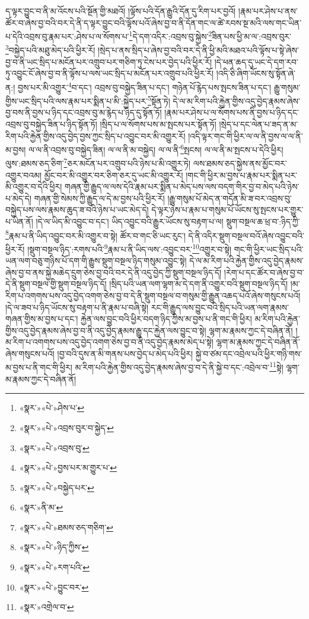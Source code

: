 ད་ལྟར་བྱུང་བ་ནི་མ་འོངས་པའི་སྔོན་གྱི་མཐའོ། །ལྟོས་པའི་དོན་རྒྱུའི་དོན་དུ་རིག་པར་བྱའོ། །རྣམ་པར་ཤེས་པ་ནས་ཚོར་བ་ཞེས་བྱ་བའི་བར་དེ་ནི་ད་ལྟར་བྱུང་བའི་ལྟོས་པའོ་ཞེས་བྱ་བ་ནི་དོན་གང་ལ་ཚེ་རབས་སྔ་མའི་ལས་གང་ཡིན་པ་དེའི་འབྲས་བུ་རྣམ་པར་:ཤེས་པ་ལ་སོགས་པ་\footnote{«སྣར་»«པེ་»ཤེས་པ་}དེ་དག་འདིར་:འབྲས་བུ་སྐྱེས་\footnote{«སྣར་»«པེ་»འབྲས་བུར་བ་སྐྱེད་}ཟིན་པས་ཕྱི་མ་ལ་:འབྲས་བུར་\footnote{«སྣར་»«པེ་»འབྲས་བུ་}བསྐྱེད་པའི་མཐུ་མེད་པའི་ཕྱིར་རོ། །སྲེད་པ་ནས་སྲིད་པ་ཞེས་བྱ་བའི་བར་དེ་ནི་ཕྱི་མའི་མཐའ་པའི་ལྟོས་པ་སྟེ་ཞེས་བྱ་བ་ནི་ཡང་སྲིད་པ་མངོན་པར་འགྲུབ་པར་གཅིག་ཏུ་ངེས་པར་བྱེད་པའི་ཕྱིར་རོ། །དེ་ཕན་ཆད་དུ་ཡང་དེ་དག་རབ་ཏུ་འབྱུང་ངོ་ཞེས་བྱ་བ་ནི་ལྟོས་པ་ལས་ཡང་སྲིད་པ་མངོན་པར་འགྲུབ་པའི་ཕྱིར་རོ། །འདི་ཅི་ཞིག་ཡོངས་སུ་སྟོན་ཞེ་ན:། བྱས་པར་མི་འགྱུར་\footnote{«སྣར་»«པེ་»བྱས་པར་མ་གྱུར་པ་}བ་དང་། འབྲས་བུ་བསྐྱེད་ཟིན་པ་དང་། གཉེན་པོ་རྙེད་པས་སྤངས་ཟིན་པ་དང་། རྒྱུ་གསུམ་གྱིས་ཡང་སྲིད་པའི་ལས་རྣམ་པར་སྨིན་པ་མི་:སྐྱེད་པར་\footnote{«སྣར་»«པེ་»བསྐྱེད་པར་}སྟོན་ཏེ། དེ་ལ་མ་རིག་པའི་རྐྱེན་གྱིས་འདུ་བྱེད་རྣམས་ཞེས་བྱ་བས་ནི་བྱས་པ་ཉིད་དང་འབྲས་བུ་མ་རྙེད་པ་ཉིད་དུ་སྟོན་ཏོ། །རྣམ་པར་ཤེས་པ་ལ་སོགས་པས་ནི་བྱས་པ་ཉིད་དང་འབྲས་བུ་བསྐྱེད་ཟིན་པ་ཉིད་སྟོན་ཏོ། །སྲིད་པ་ལ་སོགས་པས་མ་སྤངས་པར་སྟོན་ཏོ། །སྲེད་པ་དང་ལེན་པ་ཟད་ན་མ་རིག་པའི་རྐྱེན་གྱིས་འདུ་བྱེད་བྱས་ཀྱང་སྲིད་པ་འབྱུང་བར་མི་འགྱུར་རོ། །འདི་ལྟར་གང་གི་ཕྱིར་ལ་ལ་ནི་བྱས་ལ་ལ་ནི་མ་བྱས། ལ་ལ་ནི་འབྲས་བུ་བསྐྱེད་ཟིན། ལ་ལ་ནི་མ་བསྐྱེད། ལ་ལ་ནི་\footnote{«སྣར་»ནི་མ་}སྤངས། ལ་ལ་ནི་མ་སྤངས་པ་དེའི་ཕྱིར། ལུས་:ཐམས་ཅད་ཅིག་\footnote{«སྣར་»«པེ་»ཐམས་ཅད་གཅིག་}ཅར་མངོན་པར་འགྲུབ་པའི་ཉེས་པ་མི་འགྱུར་ཏེ། ལས་ཐམས་ཅད་སྐྱེས་ནས་མྱོང་བར་འགྱུར་བའམ། མྱོང་བར་མི་འགྱུར་བར་ཅིག་ཅར་དུ་ཡང་མི་འགྱུར་རོ། །གང་གི་ཕྱིར་མ་བྱས་པ་རྣམ་པར་སྨིན་པར་མི་འགྱུར་བ་དེའི་ཕྱིར། གཞན་གྱི་རྒྱུད་ལ་ལས་དེའི་རྣམ་པར་སྨིན་པ་མེད་པས་ལས་བདག་གིར་བྱ་བ་མེད་པའི་ཉེས་པ་མེད་དེ། གཞན་གྱི་སེམས་ཀྱི་རྒྱུད་ལ་དེ་མ་བྱས་པའི་ཕྱིར་རོ། །རྒྱུ་གསུམ་པོ་མེད་ན་གདོན་མི་ཟ་བར་འབྲས་བུ་བསྐྱེད་པས་ལས་རྣམས་ཆུད་ཟ་བའི་ཉེས་པ་ཡང་མེད་དེ། དེ་ལྟར་ཉེས་པ་རྣམ་པ་གསུམ་པོ་ཡོངས་སུ་སྤངས་པར་གྱུར་པ་ཡིན་ནོ། །དེ་ལ་ཡིད་མི་འབྱུང་བ་དང་། ཡིད་འབྱུང་བའི་རྒྱུར་ཡོངས་སུ་བརྟག་པ་ལ། སྡུག་བསྔལ་ཆ་ཕྲ་བ་:ཉིད་ཀྱི་\footnote{«སྣར་»«པེ་»ཉིད་ཀྱིས་}རྣམ་པ་ནི་ཡིད་འབྱུང་བར་མི་འགྱུར་བ་སྟེ། ཚོར་བ་གང་ཅི་ཡང་རུང་། དེ་ནི་འདིར་སྡུག་བསྔལ་བའོ་ཞེས་འབྱུང་བའི་ཕྱིར་རོ། །སྡུག་བསྔལ་ཉིད་:རགས་པའི་\footnote{«སྣར་»«པེ་»རག་པའི་}རྣམ་པ་ནི་ཡིད་ལས་:འབྱུང་བར་\footnote{«སྣར་»«པེ་»བྱུང་བར་}འགྱུར་བ་སྟེ། གང་གི་ཕྱིར་ཡང་སྲིད་པའི་ཡན་ལག་བཅུ་གཉིས་པོ་དག་གི་རྒྱུས་སྡུག་བསྔལ་ཉིད་གསུམ་འབྱུང་སྟེ། དེ་ལ་མ་རིག་པའི་རྐྱེན་གྱིས་འདུ་བྱེད་རྣམས་ཞེས་བྱ་བ་ནས་སྐྱེ་མཆེད་དྲུག་ཅེས་བྱ་བའི་བར་དེ་ནི་འདུ་བྱེད་ཀྱི་སྡུག་བསྔལ་ཉིད་དོ། །རེག་པ་དང་ཚོར་བ་ཞེས་བྱ་བ་དེ་ནི་སྡུག་བསྔལ་གྱི་སྡུག་བསྔལ་ཉིད་དོ། །སྲིད་པའི་ཡན་ལག་ལྷག་མ་དེ་དག་ནི་འགྱུར་བའི་སྡུག་བསྔལ་ཉིད་དོ། །མ་རིག་པ་འགགས་པས་འདུ་བྱེད་འགག་ཅེས་བྱ་བ་དེ་ནི་སྡུག་བསྔལ་བ་གསུམ་གྱི་རྒྱུན་འཆད་པའོ་ཞེས་གསུངས་པའོ། །དེ་ལ་ཟབ་པ་ཉིད་ཡོངས་སུ་བརྟག་པ་ནི་རྣམ་པ་བཞི་སྟེ། རང་གི་རྒྱུད་ལས་བྱུང་བའི་སྲིད་པའི་ཡན་ལག་རྣམས་གཞན་གྱིས་མ་བྱས་པ་དང་། རྐྱེན་ལས་བྱུང་བའི་ཕྱིར་བདག་ཉིད་ཀྱིས་མ་བྱས་པ་ནི་གང་གི་ཕྱིར། མ་རིག་པའི་རྐྱེན་གྱིས་འདུ་བྱེད་རྣམས་ཞེས་བྱ་བ་ནི་འདུ་བྱེད་རྣམས་རྒྱུ་དང་རྐྱེན་ལས་བྱུང་བ་སྟེ། ལྷག་མ་རྣམས་ཀྱང་དེ་བཞིན་ནོ། །མ་རིག་པ་འགགས་པས་འདུ་བྱེད་འགག་ཅེས་བྱ་བ་ནི་འདུ་བྱེད་རྣམས་མེད་པ་སྟེ། ལྷག་མ་རྣམས་ཀྱང་དེ་བཞིན་ནོ་ཞེས་གསུངས་པའོ། །བྱ་བའི་དུས་ན་མི་གནས་པས་བྱེད་པ་མེད་པའི་ཕྱིར། སྐྱེ་བ་ཙམ་དང་འབྲེལ་པའི་ཕྱིར་གཉི་གས་མ་བྱས་པ་ནི་གང་གི་ཕྱིར། མ་རིག་པའི་རྐྱེན་གྱིས་འདུ་བྱེད་རྣམས་ཞེས་བྱ་བ་དེ་ནི་སྐྱེ་བ་དང་:འབྲེལ་བ་\footnote{«སྣར་»འགྲེལ་བ་}སྟེ། ལྷག་མ་རྣམས་ཀྱང་དེ་བཞིན་ནོ། 